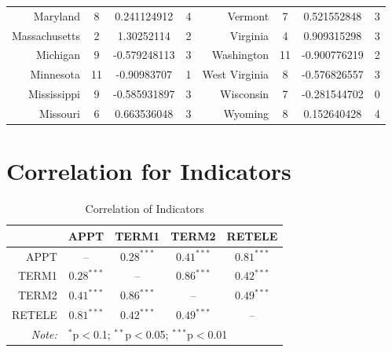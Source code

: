\documentclass[12pt]{article}
\begin{document}
\begin{table}[!h]
\begin{tabular}{|r|ccc|r|ccc|}
		Maryland	&	8	&	0.241124912	&	4	&	Vermont	&	7	&	0.521552848	&	3	\\	
		Massachusetts	&	2	&	1.30252114	&	2	&	Virginia	&	4	&	0.909315298	&	3	\\	
		Michigan	&	9	&	-0.579248113	&	3	&	Washington	&	11	&	-0.900776219	&	2	\\	
		Minnesota	&	11	&	-0.90983707	&	1	&	West Virginia	&	8	&	-0.576826557	&	3	\\	
		Mississippi	&	9	&	-0.585931897	&	3	&	Wisconsin	&	7	&	-0.281544702	&	0	\\	
		Missouri	&	6	&	0.663536048	&	3	&	Wyoming	&	8	&	0.152640428	&	4	\\	\hline
	\end{tabular}
\end{table}	

\newpage\section{Correlation for Indicators}\label{CorrInd}
\begin{table}[ht]
	\centering\caption{Correlation of Indicators}\label{indicatorcorr}
	\begin{tabular}{rcccc}
		\hline
		& APPT & TERM1 & TERM2 & RETELE \\ 
		\hline
		APPT & -- & $0.28^{***}$ & $0.41^{***}$ & $0.81^{***}$\\ 
		TERM1 &  $0.28^{***}$ & -- & $0.86^{***}$ & $0.42^{***}$ \\ 
		TERM2 &  $0.41^{***}$ &  $0.86^{***}$ & -- & $0.49^{***}$ \\ 
		RETELE &  $0.81^{***}$ &  $0.42^{***}$ &  $0.49^{***}$ & -- \\ 
		\hline
		\textit{Note:}  & \multicolumn{4}{l}{$^{*}$p$<$0.1; $^{**}$p$<$0.05; $^{***}$p$<$0.01} \\ 
	\end{tabular}
\end{table}
\end{document}
